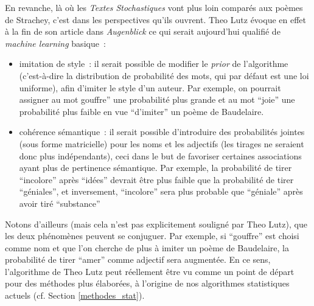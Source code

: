 \documentclass{article}
\begin{document}
				En revanche, là où les \textit{Textes Stochastiques} vont plus loin comparés aux poèmes de Strachey, c'est dans les perspectives qu'ils ouvrent. Theo Lutz évoque en effet à la fin de son article dans \textit{Augenblick} ce qui serait aujourd’hui qualifié de \textit{machine learning} basique :
				\vspace{2mm}
				\begin{itemize}
					\item imitation de style : il serait possible de modifier le \textit{prior} de l'algorithme (c'est-à-dire la distribution de probabilité des mots, qui par défaut est une loi uniforme), afin d'imiter le style d'un auteur. Par exemple, on pourrait assigner au mot gouffre'' une probabilité plus grande et au mot ``joie'' une probabilité plus faible en vue ``d'imiter'' un poème de Baudelaire.
					\item cohérence sémantique :  il serait possible d'introduire des probabilités jointes (sous forme matricielle) pour les noms et les adjectifs (les tirages ne seraient donc plus indépendants), ceci dans le but de favoriser certaines associations ayant plus de pertinence sémantique\footnotemark. Par exemple, la probabilité de tirer ``incolore'' après ``idées'' devrait être plus faible que la probabilité de tirer ``géniales'', et inversement, ``incolore'' sera plus probable que ``géniale'' après avoir tiré ``substance'' 
				\end{itemize}
				\vspace{2mm}
				
				Notons d'ailleurs (mais cela n'est pas explicitement souligné par Theo Lutz), que les deux phénomènes peuvent se conjuguer. Par exemple, si ``gouffre'' est choisi comme nom et que l'on cherche de plus à imiter un poème de Baudelaire, la probabilité de tirer ``amer'' comme adjectif sera augmentée. En ce sens, l'algorithme de Theo Lutz peut réellement être vu comme un point de départ pour des méthodes plus élaborées, à l'origine de nos algorithmes statistiques actuels (cf. Section \ref{methodes_stat}).
\end{document}
